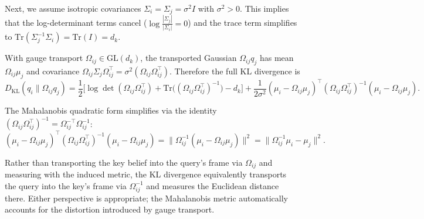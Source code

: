 \documentclass[11pt]{article}
\begin{document}
Next, we assume isotropic covariances $\Sigma_i = \Sigma_j = \sigma^2 I$ with $\sigma^2 > 0$. This implies that the log-determinant terms cancel ($\log\frac{|\Sigma_j|}{|\Sigma_i|} = 0$) and the trace term simplifies to $\mathrm{Tr}(\Sigma_j^{-1}\Sigma_i) = \mathrm{Tr}(I) = d_k$.

With gauge transport $\Omega_{ij} \in \mathrm{GL}(d_k)$, the transported Gaussian $\Omega_{ij}q_j$ has mean $\Omega_{ij}\mu_j$ and covariance $\Omega_{ij}\Sigma_j\Omega_{ij}^\top = \sigma^2(\Omega_{ij}\Omega_{ij}^\top)$. Therefore the full KL divergence is
\begin{equation}
D_{\mathrm{KL}}(q_i \| \Omega_{ij}q_j) = \frac{1}{2}\Big[\log\det(\Omega_{ij}\Omega_{ij}^\top) + \mathrm{Tr}\big((\Omega_{ij}\Omega_{ij}^\top)^{-1}\big) - d_k\Big] + \frac{1}{2\sigma^2}(\mu_i - \Omega_{ij}\mu_j)^\top(\Omega_{ij}\Omega_{ij}^\top)^{-1}(\mu_i - \Omega_{ij}\mu_j).
\end{equation}

The Mahalanobis quadratic form simplifies via the identity $(\Omega_{ij}\Omega_{ij}^\top)^{-1} = \Omega_{ij}^{-\top}\Omega_{ij}^{-1}$:
\begin{equation}
(\mu_i - \Omega_{ij}\mu_j)^\top(\Omega_{ij}\Omega_{ij}^\top)^{-1}(\mu_i - \Omega_{ij}\mu_j) = \|\Omega_{ij}^{-1}(\mu_i - \Omega_{ij}\mu_j)\|^2 = \|\Omega_{ij}^{-1}\mu_i - \mu_j\|^2.
\label{eq:mahalanobis_identity}
\end{equation}

Rather than transporting the key belief into the query's frame via $\Omega_{ij}$ and measuring with the induced metric, the KL divergence equivalently transports the query into the key's frame via $\Omega_{ij}^{-1}$ and measures the Euclidean distance there. Either perspective is appropriate; the Mahalanobis metric automatically accounts for the distortion introduced by gauge transport.
\end{document}

